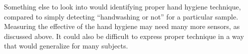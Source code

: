 \documentclass[]{report}
\begin{document}
Something else to look into would identifying proper hand hygiene technique, compared to simply detecting ``handwashing or not'' for a particular sample. Measuring the effective of the hand hygiene may need many more sensors, as discussed above. It could also be difficult to express proper technique in a way that would generalize for many subjects.










\end{document}
